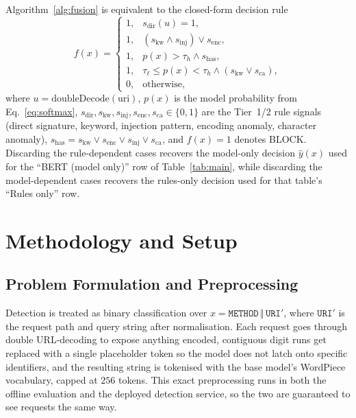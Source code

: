 \documentclass[conference]{IEEEtran}
\begin{document}
Algorithm~\ref{alg:fusion} is equivalent to the closed-form decision rule
\begin{equation}
f(x) =
\begin{cases}
1, & s_{\text{dir}}(u) = 1, \\[2pt]
1, & (s_{\text{kw}} \wedge s_{\text{inj}}) \vee s_{\text{enc}}, \\[2pt]
1, & p(x) > \tau_h \wedge s_{\text{has}}, \\[2pt]
1, & \tau_\ell \le p(x) < \tau_h \wedge (s_{\text{kw}} \vee s_{\text{ca}}), \\[2pt]
0, & \text{otherwise},
\end{cases}
\label{eq:fusion}
\end{equation}
where $u=\text{doubleDecode}(\text{uri})$, $p(x)$ is the model probability
from Eq.~\eqref{eq:softmax}, $s_{\text{dir}},s_{\text{kw}},s_{\text{inj}},s_{\text{enc}},s_{\text{ca}}\in\{0,1\}$
are the Tier~1/2 rule signals (direct signature, keyword, injection
pattern, encoding anomaly, character anomaly), $s_{\text{has}}=s_{\text{kw}}\vee s_{\text{enc}}\vee s_{\text{inj}}\vee s_{\text{ca}}$,
and $f(x)=1$ denotes BLOCK. Discarding the rule-dependent cases
recovers the model-only decision $\hat y(x)$ used for the ``BERT (model
only)'' row of Table~\ref{tab:main}, while discarding the model-dependent
cases recovers the rules-only decision used for that table's ``Rules
only'' row.

\section{Methodology and Setup}

\subsection{Problem Formulation and Preprocessing}
Detection is treated as binary classification over
$x=\texttt{METHOD}\,\Vert\,\texttt{URI}'$, where $\texttt{URI}'$ is the
request path and query string after normalisation. Each request goes
through double URL-decoding to expose anything encoded, contiguous digit
runs get replaced with a single placeholder token so the model does not
latch onto specific identifiers, and the resulting string is tokenised
with the base model's WordPiece vocabulary, capped at $256$ tokens. This
exact preprocessing runs in both the offline evaluation and the deployed
detection service, so the two are guaranteed to see requests the same
way.
\end{document}
